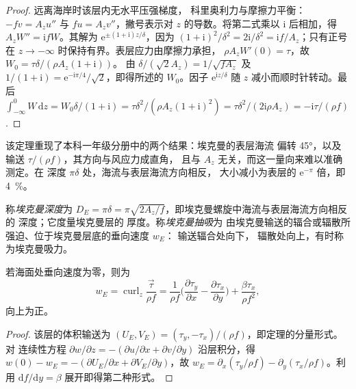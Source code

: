 \begin{proof}
远离海岸时该层内无水平压强梯度，
科里奥利力与摩擦力平衡：$-fv = A_z u''$ 与 $fu =
A_z v''$，撇号表示对 $z$ 的导数。将第二式乘以
$\mathrm i$ 后相加，得 $A_zW'' = \mathrm ifW$。其解为
$\mathrm e^{\pm(1+\mathrm i)z/\delta}$，因为 $(1+\mathrm i)^2/\delta^2 =
2\mathrm i/\delta^2 = \mathrm if/A_z$；只有正号在
$z \to -\infty$ 时保持有界。表层应力由摩擦力承担，
$\rho A_zW'(0) = \tau$，故 $W_0 = \tau\delta/(\rho A_z(1+\mathrm i))$。
由 $\delta/(\sqrt2 A_z) = 1/\sqrt{fA_z}$ 及 $1/(1+\mathrm i) = \mathrm
e^{-\mathrm i\pi/4}/\sqrt2$，即得所述的 $W_0$。因子
$\mathrm e^{\mathrm iz/\delta}$ 随 $z$ 减小而顺时针转动。最后
$\int_{-\infty}^0 W\,\mathrm dz = W_0\delta/(1+\mathrm i) =
\tau\delta^2/(\rho A_z(1+\mathrm i)^2) = \tau\delta^2/(2\mathrm i\rho A_z)
= -\mathrm i\tau/(\rho f)$.
\end{proof}

该定理重现了本科一年级分册中的两个结果：埃克曼的表层海流
偏转 \ang{45}，以及输送 $\tau/(\rho f)$，其方向与风应力成直角，
且与 $A_z$ 无关，而这一量向来难以准确测定。在
深度 $\pi\delta$ 处，海流与表层海流方向相反，
大小减小为表层的 $\mathrm e^{-\pi}$ 倍，即 \qty{4}{\percent}。

\begin{definition}\label{def:b3:ocean-dynamics:ekman-pumping}
称\emph{埃克曼深度}为 $D_E = \pi\delta =
\pi\sqrt{2A_z/f}$，即埃克曼螺旋中海流与表层海流方向相反的
深度；它度量埃克曼层的
厚度。称\emph{埃克曼抽吸}为
由埃克曼输送的辐合或辐散所强迫、位于埃克曼层底的垂向速度 $w_E$：
输送辐合处向下，
辐散处向上，有时称为埃克曼吸力。
\end{definition}

\begin{proposition}[埃克曼抽吸]\label{prop:b3:ocean-dynamics:pumping}
若海面处垂向速度为零，则为
\[
w_E = \operatorname{curl}_z\frac{\vec\tau}{\rho f}
= \frac{1}{\rho f}\Big(\frac{\partial\tau_y}{\partial x} -
\frac{\partial\tau_x}{\partial y}\Big) + \frac{\beta\tau_x}{\rho f^2} ,
\]
向上为正。
\end{proposition}

\begin{proof}
该层的体积输送为 $(U_E, V_E) = (\tau_y,
-\tau_x)/(\rho f)$，即定理的分量形式。对
连续性方程 $\partial w/\partial z = -(\partial u/\partial x +
\partial v/\partial y)$ 沿层积分，得 $w(0) - w_E = -(\partial
U_E/\partial x + \partial V_E/\partial y)$，故 $w_E = \partial_x(\tau_y/\rho
f) - \partial_y(\tau_x/\rho f)$。利用 $\mathrm df/\mathrm dy =
\beta$ 展开即得第二种形式。
\end{proof}

